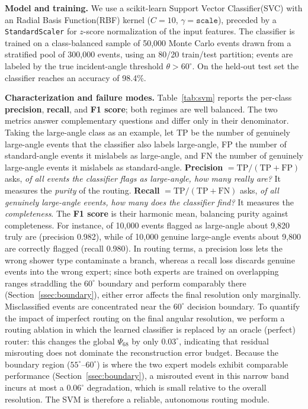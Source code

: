 \documentclass[preprint,12pt]{elsarticle}
\begin{document}
\textbf{Model and training.} We use a scikit-learn Support Vector Classifier(SVC) with an Radial Basis Function(RBF) kernel ($C=10$, $\gamma=\texttt{scale}$), preceded by a \texttt{StandardScaler} for $z$-score normalization of the input features. The classifier is trained on a class-balanced sample of 50,000 Monte Carlo events drawn from a stratified pool of 300,000 events, using an 80/20 train/test partition; events are labeled by the true incident-angle threshold $\theta>60^{\circ}$. On the held-out test set the classifier reaches an accuracy of 98.4\%.

\textbf{Characterization and failure modes.} Table~\ref{tab:svm} reports the per-class \textbf{precision}, \textbf{recall}, and \textbf{F1 score}; both regimes are well balanced. The two metrics answer complementary questions and differ only in their denominator. Taking the large-angle class as an example, let TP be the number of genuinely large-angle events that the classifier also labels large-angle, FP the number of standard-angle events it mislabels as large-angle, and FN the number of genuinely large-angle events it mislabels as standard-angle. \textbf{Precision} $=\mathrm{TP}/(\mathrm{TP}+\mathrm{FP})$ asks, \emph{of all events the classifier flags as large-angle, how many really are?} It measures the \emph{purity} of the routing. \textbf{Recall} $=\mathrm{TP}/(\mathrm{TP}+\mathrm{FN})$ asks, \emph{of all genuinely large-angle events, how many does the classifier find?} It measures the \emph{completeness}. The \textbf{F1 score} is their harmonic mean, balancing purity against completeness. For instance, of 10,000 events flagged as large-angle about 9,820 truly are (precision 0.982), while of 10,000 genuine large-angle events about 9,800 are correctly flagged (recall 0.980). In routing terms, a precision loss lets the wrong shower type contaminate a branch, whereas a recall loss discards genuine events into the wrong expert; since both experts are trained on overlapping ranges straddling the $60^{\circ}$ boundary and perform comparably there (Section~\ref{ssec:boundary}), either error affects the final resolution only marginally. Misclassified events are concentrated near the $60^{\circ}$ decision boundary. To quantify the impact of imperfect routing on the final angular resolution, we perform a routing ablation in which the learned classifier is replaced by an oracle (perfect) router: this changes the global $\Psi_{68}$ by only $0.03^{\circ}$, indicating that residual misrouting does not dominate the reconstruction error budget. Because the boundary region ($55^{\circ}$--$60^{\circ}$) is where the two expert models exhibit comparable performance (Section~\ref{ssec:boundary}), a misrouted event in this narrow band incurs at most a $0.06^{\circ}$ degradation, which is small relative to the overall resolution. The SVM is therefore a reliable, autonomous routing module.%
\end{document}
